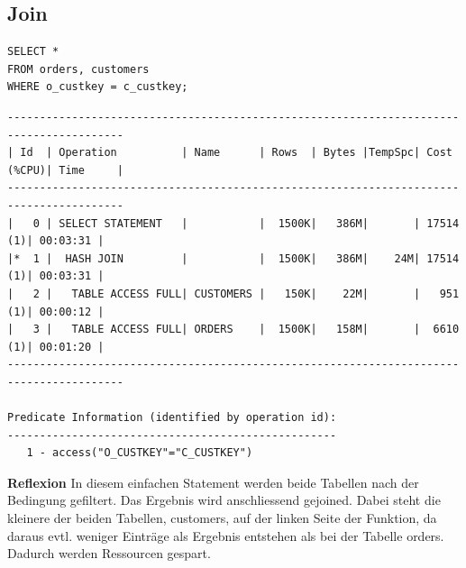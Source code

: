 \documentclass[10pt]{article}
\begin{document}
\subsection{Join}
\begin{lstlisting}[style=sql]
SELECT *
FROM orders, customers
WHERE o_custkey = c_custkey;
\end{lstlisting}
\begin{lstlisting}[style=queryexecutionplan]
----------------------------------------------------------------------------------------
| Id  | Operation          | Name      | Rows  | Bytes |TempSpc| Cost (%CPU)| Time     |
----------------------------------------------------------------------------------------
|   0 | SELECT STATEMENT   |           |  1500K|   386M|       | 17514   (1)| 00:03:31 |
|*  1 |  HASH JOIN         |           |  1500K|   386M|    24M| 17514   (1)| 00:03:31 |
|   2 |   TABLE ACCESS FULL| CUSTOMERS |   150K|    22M|       |   951   (1)| 00:00:12 |
|   3 |   TABLE ACCESS FULL| ORDERS    |  1500K|   158M|       |  6610   (1)| 00:01:20 |
----------------------------------------------------------------------------------------
 
Predicate Information (identified by operation id):
---------------------------------------------------
   1 - access("O_CUSTKEY"="C_CUSTKEY")
\end{lstlisting}
\textbf{Reflexion} \newline
In diesem einfachen Statement werden beide Tabellen nach der Bedingung gefiltert.
Das Ergebnis wird anschliessend gejoined. Dabei steht die kleinere der beiden Tabellen, customers, auf der linken Seite der Funktion, da daraus evtl. weniger Einträge als Ergebnis entstehen als bei der Tabelle orders. Dadurch werden Ressourcen gespart.
\end{document}

